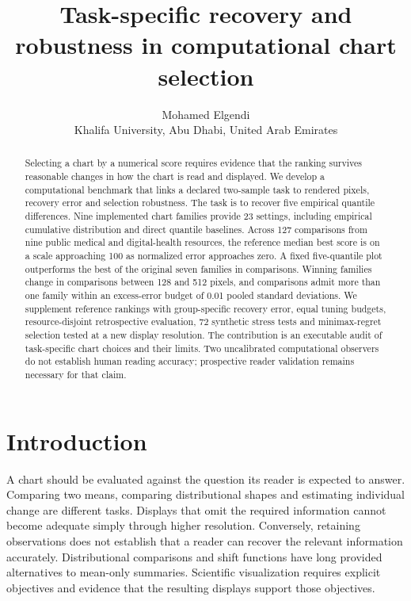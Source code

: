 \documentclass[11pt]{article}
\title{Task-specific recovery and robustness in computational chart selection}
\author{Mohamed Elgendi\\Khalifa University, Abu Dhabi, United Arab Emirates}
\date{}
\begin{document}
\maketitle
\begin{abstract}
Selecting a chart by a numerical score requires evidence that the ranking survives reasonable changes in how the chart is read and displayed. We develop a computational benchmark that links a declared two-sample task to rendered pixels, recovery error and selection robustness. The task is to recover five empirical quantile differences. Nine implemented chart families provide 23 settings, including empirical cumulative distribution and direct quantile baselines. Across 127 comparisons from nine public medical and digital-health resources, the reference median best score is \BestMedian{} on a scale approaching 100 as normalized error approaches zero. A fixed five-quantile plot outperforms the best of the original seven families in \QuantileBetter{} comparisons. Winning families change in \ResolutionChanged{} comparisons between 128 and 512 pixels, and \NearCount{} comparisons admit more than one family within an excess-error budget of 0.01 pooled standard deviations. We supplement reference rankings with group-specific recovery error, equal tuning budgets, resource-disjoint retrospective evaluation, 72 synthetic stress tests and minimax-regret selection tested at a new display resolution. The contribution is an executable audit of task-specific chart choices and their limits. Two uncalibrated computational observers do not establish human reading accuracy; prospective reader validation remains necessary for that claim.
\end{abstract}

\section*{Introduction}
A chart should be evaluated against the question its reader is expected to answer. Comparing two means, comparing distributional shapes and estimating individual change are different tasks. Displays that omit the required information cannot become adequate simply through higher resolution. Conversely, retaining observations does not establish that a reader can recover the relevant information accurately. Distributional comparisons and shift functions have long provided alternatives to mean-only summaries.\cite{weissgerber2015,rousselet2017} Scientific visualization requires explicit objectives and evidence that the resulting displays support those objectives.\cite{elgendi2017,elgendi2020}
\end{document}
